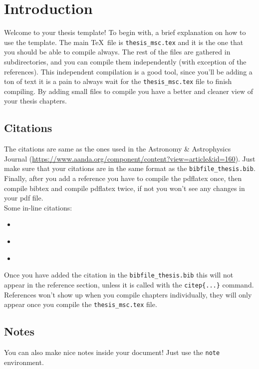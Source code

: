 \documentclass[../main/thesis_msc.tex]{subfiles}
\begin{document}
    \chapter{Introduction}

    Welcome to your thesis template! To begin with, a brief explanation on how to use the template. The main \TeX\, file is \texttt{thesis\_msc.tex} and it is the one that you should be able to compile always. The rest of the files are gathered in subdirectories, and you can compile them independently (with exception of the references). This independent compilation is a good tool, since you'll be adding a ton of text it is a pain to always wait for the \texttt{thesis\_msc.tex} file to finish compiling. By adding small files to compile you have a better and cleaner view of your thesis chapters.



    \section{Citations}
    The citations are same as the ones used in the Astronomy \& Astrophysics Journal (\url{https://www.aanda.org/component/content?view=article&id=160}). Just make sure that your citations are in the same format as the \texttt{bibfile\_thesis.bib}. Finally, after you add a reference you have to compile the pdflatex once, then compile bibtex and compile pdflatex twice, if not you won't see any changes in your pdf file. \\

    \noindent Some in-line citations:
    \begin{itemize}
        \item \citep{bracewell1978fourier}
        \item \citet{bracewell1978fourier}
        \item \citep[see][]{bracewell1978fourier}
    \end{itemize}

    Once you have added the citation in the \texttt{bibfile\_thesis.bib} this will not appear in the reference section, unless it is called with the \texttt{citep\{...\}} command. References won't show up when you compile chapters individually, they will only appear once you compile the \texttt{thesis\_msc.tex} file.

    \section{Notes}
    You can also make nice notes inside your document! Just use the \texttt{note} environment.
\end{document}
